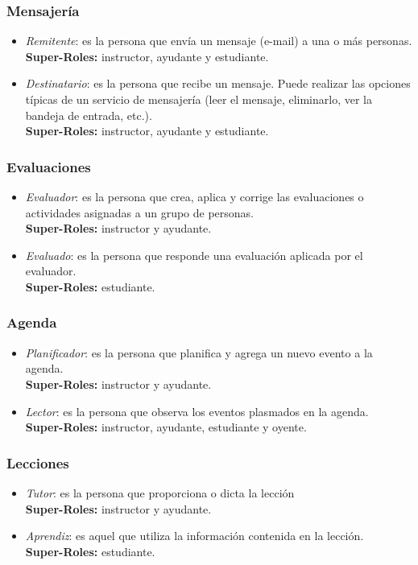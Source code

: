 \subsubsection{Mensajería}
\begin{itemize}
	\item \emph{Remitente}: es la persona que envía un mensaje (e-mail) a una o más personas.\\
		\textbf{Super-Roles:} instructor, ayudante y estudiante.
	\item \emph{Destinatario}: es la persona que recibe un mensaje. Puede realizar las opciones típicas de un servicio de mensajería (leer el mensaje, eliminarlo, ver la bandeja de entrada, etc.).\\
		\textbf{Super-Roles:} instructor, ayudante y estudiante.
\end{itemize}

\subsubsection{Evaluaciones}
\begin{itemize}
	\item \emph{Evaluador}: es la persona que crea, aplica y corrige las evaluaciones o actividades asignadas a un grupo de personas.\\
		\textbf{Super-Roles:} instructor y ayudante.
	\item \emph{Evaluado}: es la persona que responde una evaluación aplicada por el evaluador.\\
		\textbf{Super-Roles:} estudiante.
\end{itemize}

\subsubsection{Agenda}
\begin{itemize}
	\item \emph{Planificador}: es la persona que planifica y agrega un nuevo evento a la agenda.\\
		\textbf{Super-Roles:} instructor y ayudante.
	\item \emph{Lector}: es la persona que observa los eventos plasmados en la agenda.\\
		\textbf{Super-Roles:} instructor, ayudante, estudiante y oyente.
\end{itemize}

\subsubsection{Lecciones}
\begin{itemize}
	\item \emph{Tutor}: es la persona que proporciona o dicta la lección\\
			\textbf{Super-Roles:} instructor y ayudante.
	\item \emph{Aprendiz}: es aquel que utiliza la información contenida en la lección.\\
			\textbf{Super-Roles:} estudiante.
\end{itemize}

